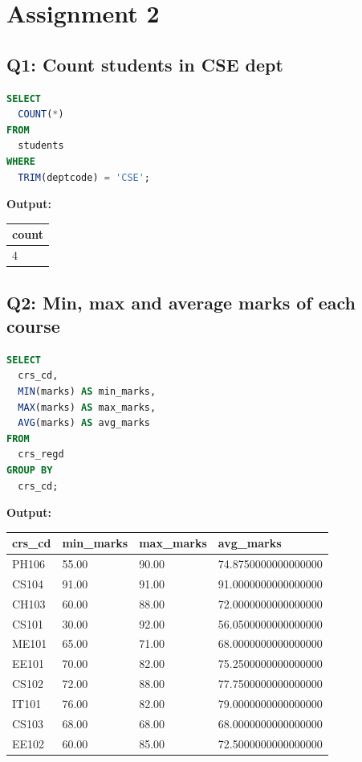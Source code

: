 \documentclass[11pt, a4paper]{article}
\begin{document}
\section{Assignment 2}
\subsection*{Q1: Count students in CSE dept}
\begin{lstlisting}[language=SQL]
SELECT
  COUNT(*)
FROM
  students
WHERE
  TRIM(deptcode) = 'CSE';
\end{lstlisting}
\vspace{0.3cm}
\textbf{Output:}\vspace{0.2cm}
\begin{center}
\begin{tabular}{|l|}
\hline
\textbf{count} \\ \hline
4 \\ \hline
\end{tabular}
\end{center}
\newpage
\subsection*{Q2: Min, max and average marks of each course}
\begin{lstlisting}[language=SQL]
SELECT
  crs_cd,
  MIN(marks) AS min_marks,
  MAX(marks) AS max_marks,
  AVG(marks) AS avg_marks
FROM
  crs_regd
GROUP BY
  crs_cd;
\end{lstlisting}
\vspace{0.3cm}
\textbf{Output:}\vspace{0.2cm}
\begin{center}
\begin{tabular}{|l|l|l|l|}
\hline
\textbf{crs\_cd} & \textbf{min\_marks} & \textbf{max\_marks} & \textbf{avg\_marks} \\ \hline
PH106 & 55.00 & 90.00 & 74.8750000000000000 \\ \hline
CS104 & 91.00 & 91.00 & 91.0000000000000000 \\ \hline
CH103 & 60.00 & 88.00 & 72.0000000000000000 \\ \hline
CS101 & 30.00 & 92.00 & 56.0500000000000000 \\ \hline
ME101 & 65.00 & 71.00 & 68.0000000000000000 \\ \hline
EE101 & 70.00 & 82.00 & 75.2500000000000000 \\ \hline
CS102 & 72.00 & 88.00 & 77.7500000000000000 \\ \hline
IT101 & 76.00 & 82.00 & 79.0000000000000000 \\ \hline
CS103 & 68.00 & 68.00 & 68.0000000000000000 \\ \hline
EE102 & 60.00 & 85.00 & 72.5000000000000000 \\ \hline
\end{tabular}
\end{center}
\newpage
\end{document}
